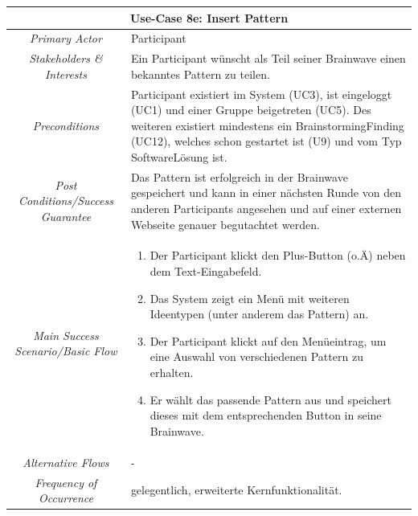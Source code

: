 \renewcommand{\arraystretch}{1.35}
\begin{center}
	\begin{longtable}{| c | p{7cm} |}
		\hline
		\multicolumn{2}{|c|}{\textbf{Use-Case 8e: Insert Pattern}}\\
		\hline\hline
		\textit{Primary Actor} & Participant\\
		\hline
		\textit{Stakeholders \& Interests} & Ein Participant wünscht als Teil seiner Brainwave einen bekanntes Pattern zu teilen. \\
		\hline
		\textit{Preconditions} & Participant existiert im System (UC3), ist eingeloggt (UC1) und einer Gruppe beigetreten (UC5). Des weiteren existiert mindestens ein BrainstormingFinding (UC12), welches schon gestartet ist (U9) und vom Typ SoftwareLösung ist.\\
		\hline
		\textit{Post Conditions/Success Guarantee} & Das Pattern ist erfolgreich in der Brainwave gespeichert und kann in einer nächsten Runde von den anderen Participants angesehen und auf einer externen Webseite genauer begutachtet werden.\\
		\hline
		\textit{Main Success Scenario/Basic Flow} & 
		\begin{enumerate}[noitemsep]
			\item Der Participant klickt den Plus-Button (o.Ä) neben dem Text-Eingabefeld.
			\item Das System zeigt ein Menü mit weiteren Ideentypen (unter anderem das Pattern) an.
			\item Der Participant klickt auf den Menüeintrag, um eine Auswahl von verschiedenen Pattern zu erhalten.
			\item Er wählt das passende Pattern aus und speichert dieses mit dem entsprechenden Button in seine Brainwave.
		\end{enumerate}\\
		\hline
		\textit{Alternative Flows} &
		-\\
		\hline
		\textit{Frequency of Occurrence} & gelegentlich, erweiterte Kernfunktionalität.\\
		\hline
	\end{longtable}
\end{center}

